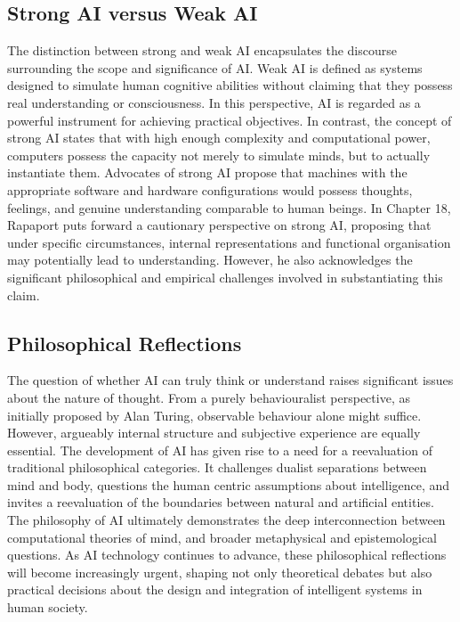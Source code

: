 \documentclass[runningheads]{llncs}
\begin{document}
\subsection{Strong AI versus Weak AI}
%
The distinction between strong and weak AI encapsulates the discourse surrounding the scope and significance of AI. Weak AI is defined as systems designed to simulate human cognitive abilities without claiming that they possess real understanding or consciousness. In this perspective, AI is regarded as a powerful instrument for achieving practical objectives.
In contrast, the concept of strong AI states that with high enough complexity and computational power, computers possess the capacity not merely to simulate minds, but to actually instantiate them. Advocates of strong AI propose that machines with the appropriate software and hardware configurations would possess thoughts, feelings, and genuine understanding comparable to human beings.
In Chapter 18, Rapaport puts forward a cautionary perspective on strong AI, proposing that under specific circumstances, internal representations and functional organisation may potentially lead to understanding. However, he also acknowledges the significant philosophical and empirical challenges involved in substantiating this claim.
%
%
\subsection{Philosophical Reflections}
%
The question of whether AI can truly think or understand raises significant issues about the nature of thought. From a purely behaviouralist perspective, as initially proposed by Alan Turing, observable behaviour alone might suffice. However, argueably internal structure and subjective experience are equally essential.
The development of AI has given rise to a need for a reevaluation of traditional philosophical categories. It challenges dualist separations between mind and body, questions the human centric assumptions about intelligence, and invites a reevaluation of the boundaries between natural and artificial entities.
The philosophy of AI ultimately demonstrates the deep interconnection between computational theories of mind, and broader metaphysical and epistemological questions. As AI technology continues to advance, these philosophical reflections will become increasingly urgent, shaping not only theoretical debates but also practical decisions about the design and integration of intelligent systems in human society.
%
%
%
%
%
\end{document}
